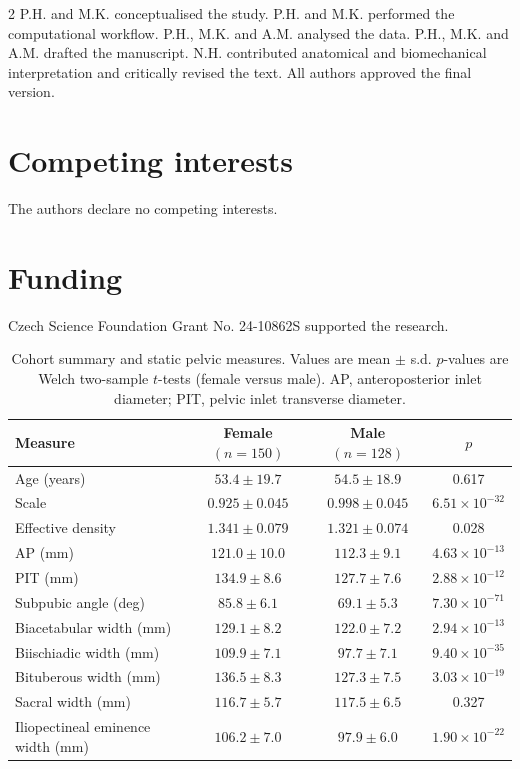 \documentclass[openacc]{rsproca_new}
\begin{document}
\begin{multicols}{2}
P.H. and M.K. conceptualised the study. P.H. and M.K. performed the computational workflow. P.H., M.K. and A.M. analysed the data. P.H., M.K. and A.M. drafted the manuscript. N.H. contributed anatomical and biomechanical interpretation and critically revised the text. All authors approved the final version.

\section*{Competing interests}

The authors declare no competing interests.

\section*{Funding}
Czech Science Foundation Grant No. 24-10862S supported the research.
\end{multicols}

\begin{table}[p]
\centering
\caption{Cohort summary and static pelvic measures. Values are mean $\pm$ s.d. $p$-values are Welch two-sample $t$-tests (female versus male). AP, anteroposterior inlet diameter; PIT, pelvic inlet transverse diameter.}
\label{tab:cohort}
\begin{tabular}{lccc}
\toprule
Measure & Female $(n=150)$ & Male $(n=128)$ & $p$ \\
\midrule
Age (years) & $53.4 \pm 19.7$ & $54.5 \pm 18.9$ & 0.617 \\
Scale & $0.925 \pm 0.045$ & $0.998 \pm 0.045$ & $6.51 \times 10^{-32}$ \\
Effective density & $1.341 \pm 0.079$ & $1.321 \pm 0.074$ & 0.028 \\
AP (mm) & $121.0 \pm 10.0$ & $112.3 \pm 9.1$ & $4.63 \times 10^{-13}$ \\
PIT (mm) & $134.9 \pm 8.6$ & $127.7 \pm 7.6$ & $2.88 \times 10^{-12}$ \\
Subpubic angle (deg) & $85.8 \pm 6.1$ & $69.1 \pm 5.3$ & $7.30 \times 10^{-71}$ \\
Biacetabular width (mm) & $129.1 \pm 8.2$ & $122.0 \pm 7.2$ & $2.94 \times 10^{-13}$ \\
Biischiadic width (mm) & $109.9 \pm 7.1$ & $97.7 \pm 7.1$ & $9.40 \times 10^{-35}$ \\
Bituberous width (mm) & $136.5 \pm 8.3$ & $127.3 \pm 7.5$ & $3.03 \times 10^{-19}$ \\
Sacral width (mm) & $116.7 \pm 5.7$ & $117.5 \pm 6.5$ & 0.327 \\
Iliopectineal eminence width (mm) & $106.2 \pm 7.0$ & $97.9 \pm 6.0$ & $1.90 \times 10^{-22}$ \\
\bottomrule
\end{tabular}
\end{table}
\end{document}
